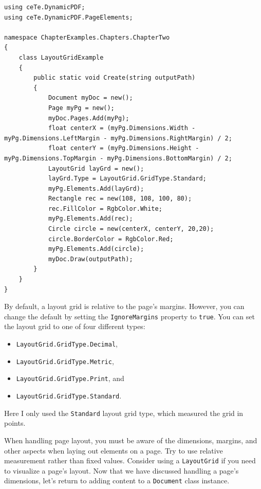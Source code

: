 \documentclass[american]{tufte-book}
\numberwithin{equation}{section}
\numberwithin{figure}{section}
\begin{document}
\bgroup{}
\begin{lstlisting}[caption={Using the LayoutGrid class for development.},label={lis:ly-grid-Example-using-the},basicstyle={\footnotesize\ttfamily},breaklines=true]
using ceTe.DynamicPDF;
using ceTe.DynamicPDF.PageElements;

namespace ChapterExamples.Chapters.ChapterTwo
{
    class LayoutGridExample
    {
        public static void Create(string outputPath)
        {
            Document myDoc = new();
            Page myPg = new();
            myDoc.Pages.Add(myPg);
            float centerX = (myPg.Dimensions.Width - myPg.Dimensions.LeftMargin - myPg.Dimensions.RightMargin) / 2;
            float centerY = (myPg.Dimensions.Height - myPg.Dimensions.TopMargin - myPg.Dimensions.BottomMargin) / 2;
            LayoutGrid layGrd = new();
            layGrd.Type = LayoutGrid.GridType.Standard;
            myPg.Elements.Add(layGrd);
            Rectangle rec = new(108, 108, 100, 80);
            rec.FillColor = RgbColor.White;
            myPg.Elements.Add(rec);
            Circle circle = new(centerX, centerY, 20,20);
            circle.BorderColor = RgbColor.Red;
            myPg.Elements.Add(circle);         
            myDoc.Draw(outputPath);
        }
    }
}
\end{lstlisting}
\leavevmode\egroup

By default, a layout grid is relative to the page's margins. However,
you can change the default by setting the \texttt{IgnoreMargins} property
to \texttt{true}. You can set the layout grid to one of four different
types:
\begin{itemize}
\item \texttt{LayoutGrid.GridType.Decimal},
\item \texttt{LayoutGrid.GridType.Metric},
\item \texttt{LayoutGrid.GridType.Print}, and
\item \texttt{LayoutGrid.GridType.Standard}.
\end{itemize}
Here I only used the \texttt{Standard} layout grid type, which measured
the grid in points. 

When handling page layout, you must be aware of the dimensions, margins, and other aspects when laying out elements on a page. Try to use relative measurement rather than fixed values. Consider using a \texttt{LayoutGrid} if you need to visualize a page's layout. Now that we have discussed handling a page's dimensions, let's return to adding content to a \texttt{Document} class instance.
\end{document}
